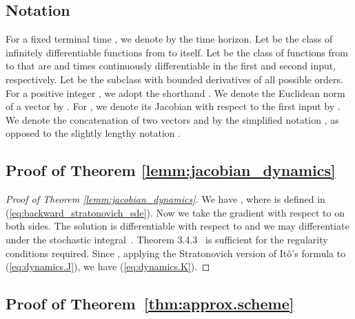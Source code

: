 \documentclass[twoside]{article}
\begin{document}
\subsection{Notation} \label{app:notation}
For a fixed terminal time , we denote by  the time horizon. Let 
 be the class of infinitely differentiable functions from  to itself.
Let  be the class of functions from  to  that are  and  times continuously differentiable in the first and second input, respectively. 
Let  be the subclass with bounded derivatives of all possible orders.
For a positive integer , we adopt the shorthand . 
We denote the Euclidean norm of a vector  by .
For , we denote its Jacobian with respect to the first input by .
We denote the concatenation of two vectors  and  by the simplified notation , as opposed to the slightly lengthy notation .

\subsection{Proof of Theorem \ref{lemm:jacobian_dynamics}}
\begin{proof}[Proof of Theorem \ref{lemm:jacobian_dynamics}]
\label{app:jacobian_dynamics}
We have , where  is defined in (\ref{eq:backward_stratonovich_sde}).
Now we take the gradient with respect to  on both sides. The solution is differentiable with respect to  and we may differentiate under the stochastic integral~\cite[Proposition 2.4.3]{kunita2019stochastic}. 
Theorem 3.4.3~\cite{kunita2019stochastic} is sufficient for the regularity conditions required.
Since , applying the Stratonovich version of It\^{o}'s formula to (\ref{eq:dynamics.J}), we have (\ref{eq:dynamics.K}).
\end{proof}
 \subsection{Proof of Theorem~\ref{thm:approx.scheme}}\label{app:approx.scheme}
\end{document}
